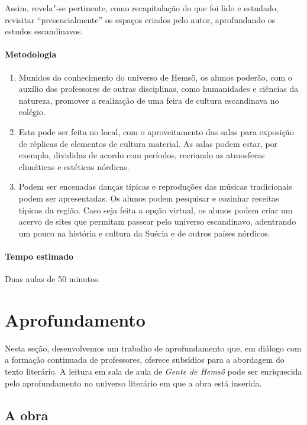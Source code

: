 \documentclass[12pt]{extarticle}
\begin{document}
Assim, revela"-se pertinente, como recapitulação do que foi lido e estudado, revisitar ``presencialmente'' os espaços 
criados pelo autor, aprofundando os estudos escandinavos. 

\paragraph{Metodologia}

\begin{enumerate}

\item
Munidos do conhecimento do universo de Hemsö, os alunos
poderão, com o auxílio dos professores de outras disciplinas, como humanidades e ciências da natureza, 
promover a realização de uma feira de cultura escandinava no colégio. 

\item
Esta pode ser feita no local, com o aproveitamento das salas para exposição 
de réplicas de elementos de cultura material. As salas podem estar, por exemplo, 
divididas de acordo com períodos, recriando as atmosferas climáticas e estéticas nórdicas. 

\item
Podem ser encenadas danças típicas e reproduções das músicas tradicionais podem ser apresentadas. 
Os alunos podem pesquisar e cozinhar receitas típicas da região. 
Caso seja feita a opção virtual, os alunos podem criar um acervo de sites 
que permitam passear pelo universo escandinavo, adentrando um pouco na história e cultura da
Suécia e de outros países nórdicos.

\end{enumerate}

\paragraph{Tempo estimado} Duas aulas de 50 minutos.


\section{Aprofundamento}

Nesta seção, desenvolvemos um trabalho de aprofundamento que, em diálogo
com a formação continuada de professores, oferece subsídios para a
abordagem do texto literário. A leitura em sala de aula de \emph{Gente
de Hemsö} pode ser enriquecida pelo aprofundamento no universo literário
em que a obra está inserida.

\subsection{A obra}
\end{document}
